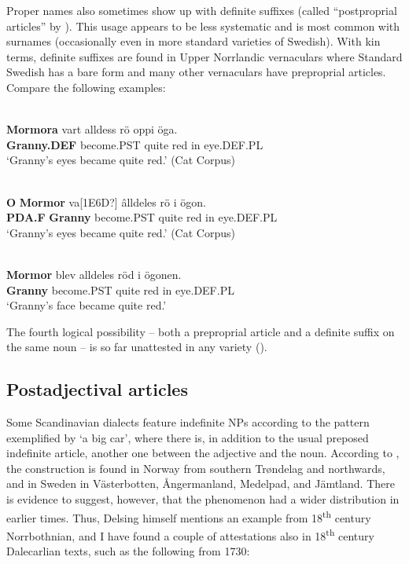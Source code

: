 Proper names also sometimes show up with definite suffixes (called “postproprial articles” by \citet[23]{Delsing2003a}). This usage appears to be less systematic and is most common with surnames (occasionally even in more standard varieties of Swedish). With kin terms, definite suffixes are found in Upper Norrlandic vernaculars where Standard Swedish has a bare form and many other vernaculars have preproprial articles. Compare the following examples:

\ea\label{}
\\
\gll \textbf{Mormora} vart  alldess  rö  oppi  öga.\\
\textbf{Granny.DEF} become.PST  quite  red  in  eye.DEF.PL\\
\glt ‘Granny’s eyes became quite red.’ (Cat Corpus)

\z

\ea\label{}
\\
\gll \textbf{O} \textbf{Mormor} va[1E6D?]  âlldeles  rö  i  ögon.\\
\textbf{PDA.F} \textbf{Granny} become.PST  quite  red  in  eye.DEF.PL\\
\glt ‘Granny’s eyes became quite red.’ (Cat Corpus)

\z

\ea\label{}
\\
\gll \textbf{Mormor} blev  alldeles  röd  i  ögonen.\\
\textbf{Granny} become.PST  quite  red  in  eye.DEF.PL\\
\glt ‘Granny’s face became quite red.’ 

\z

The fourth logical possibility – both a preproprial article and a definite suffix on the same noun – is so far unattested in any variety (\citet{Törnqvist2002}). 

\subsection{ Postadjectival articles}

Some Scandinavian dialects feature indefinite NPs according to the pattern exemplified by ‘a big car’, where there is, in addition to the usual preposed indefinite article, another one between the adjective and the noun. According to \citet[46]{Delsing2003a}, the construction is found in Norway from southern Trøndelag and northwards, and in Sweden in Västerbotten, Ångermanland, Medelpad, and Jämtland. There is evidence to suggest, however, that the phenomenon had a wider distribution in earlier times. Thus, Delsing himself mentions an example from 18\textsuperscript{th} century Norrbothnian, and I have found a couple of attestations also in 18\textsuperscript{th} century Dalecarlian texts, such as the following from 1730: 

